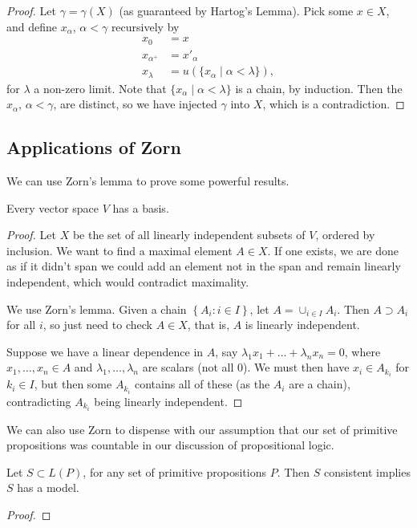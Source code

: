 \documentclass[a3paper, 10pt]{article}
\begin{document}
\begin{multicols*}{5}
\begin{proof}
  Let $\gamma = \gamma(X)$ (as guaranteed by Hartog's Lemma). Pick some $x \in X$, and define $x_\alpha$, $\alpha < \gamma$ recursively by
  \begin{align*}
    x_0 &= x \\ x_{\alpha^+} &= x'_{\alpha} \\
    x_{\lambda} &= u(\{x_\alpha \mid \alpha < \lambda\}),
  \end{align*}
  for $\lambda$ a non-zero limit. Note that $\{x_\alpha \mid \alpha < \lambda\}$ is a chain, by induction. Then the $x_\alpha$, $\alpha < \gamma$, are distinct, so we have injected $\gamma$ into $X$, which is a contradiction.
\end{proof}

\subsection{Applications of Zorn}
We can use Zorn's lemma to prove some powerful results.

\begin{theorem}
  Every vector space $V$ has a basis.
\end{theorem}
\begin{proof}
  Let $X$ be the set of all linearly independent subsets of $V$, ordered by inclusion.
  We want to find a maximal element $A \in X$. If one exists, we are done as if it didn't span we could add an element not in the span and remain linearly independent, which would contradict maximality.

  We use Zorn's lemma. Given a chain $\left\{A_i: i \in I\right\}$, let $A=\cup_{i \in I} A_i$. Then $A \supset A_i$ for all $i$, so just need to check $A \in X$, that is, $A$ is linearly independent.

Suppose we have a linear dependence in $A$, say $\lambda_1 x_1+\ldots+\lambda_n x_n=0$, where $x_1, \ldots, x_n \in A$ and $\lambda_1, \ldots, \lambda_n$ are scalars (not all 0). 
We must then have $x_i \in A_{k_i}$ for $k_i \in I$, but then some $A_{k_i}$ contains all of these (as the $A_i$ are a chain), contradicting $A_{k_i}$ being linearly independent.
\end{proof}

We can also use Zorn to dispense with our assumption that our set of primitive propositions was countable in our discussion of propositional logic.

\begin{theorem}  Let $S \subset L(P)$, for any set of primitive propositions $P$. Then $S$ consistent implies $S$ has a model.
\end{theorem}
\begin{proof}
  

\end{proof}
\end{multicols*}
\end{document}
